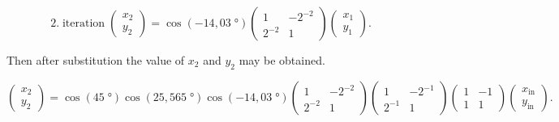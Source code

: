 \documentclass[a4paper, twoside, 11pt]{article}
\begin{document}
            \begin{equation}
                2.\;\text{iteration}\;
                \begin{pmatrix}
                    x_2\\y_2
                \end{pmatrix}
                =
                \cos (-14,03\;°)
                \begin{pmatrix}
                    1 & -2^{-2}\\
                    2^{-2} & 1
                \end{pmatrix}
                \begin{pmatrix}
                    x_1\\
                    y_1
                \end{pmatrix}.
            \end{equation}

            Then after substitution the value of $x_2$ and $y_2$ may be obtained.\par
            \begin{equation}\label{eq:example-cordic-calculation}
                \begin{pmatrix}
                    x_2\\y_2
                \end{pmatrix}
                =
                \cos (45\;°)
                \cos (25,565\;°)
                \cos (-14,03\;°)
                \begin{pmatrix}
                    1 & -2^{-2}\\
                    2^{-2} & 1
                \end{pmatrix}
                \begin{pmatrix}
                    1 & -2^{-1}\\
                    2^{-1} & 1
                \end{pmatrix}
                \begin{pmatrix}
                    1 & -1\\
                    1 & 1
                \end{pmatrix}
                \begin{pmatrix}
                    x_\text{in}\\
                    y_\text{in}
                \end{pmatrix}.
            \end{equation}
\end{document}
